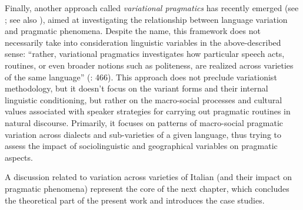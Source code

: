 Finally, another approach called \textit{variational pragmatics} has recently emerged (see \citealt{BarronSchneider2009}; see also \citealt{Placencia2011}), aimed at investigating the relationship between language variation and pragmatic phenomena. Despite the name, this framework does not necessarily take into con\-sideration linguistic variables in the above-described sense: “rather, variational pragmatics investigates how par\-ticular speech acts, routines, or even broader notions such as politeness, are realized across varieties of the same language” (\citealt{CameronSchwenter2013}: 466). This approach does not preclude variationist methodology, but it doesn’t focus on the variant forms and their internal linguistic conditioning, but rather on the macro-social processes and cultural values associated with speaker strategies for carrying out prag\-matic routines in natural discourse. Primarily, it focuses on patterns of macro-social pragmatic variation across dialects and sub-varieties of a given language, thus trying to assess the impact of sociolinguistic and geographical variables on pragmatic aspects.

A discussion related to variation across varieties of Italian (and their impact on pragmatic phenomena) represent the core of the next chapter, which concludes the theoretical part of the present work and introduces the case studies.

